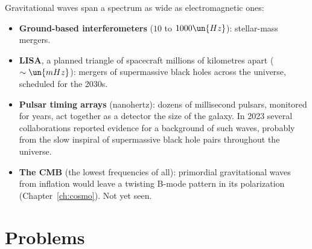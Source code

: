 Gravitational waves span a spectrum as wide as electromagnetic ones:
\begin{itemize}[itemsep=3pt]
  \item \textbf{Ground-based interferometers} ($10$ to $1000\un{Hz}$): stellar-mass mergers.
  \item \textbf{LISA}, a planned triangle of spacecraft millions of kilometres apart ($\sim\un{mHz}$): mergers of supermassive black holes across the universe, scheduled for the 2030s.
  \item \textbf{Pulsar timing arrays} (nanohertz): dozens of millisecond pulsars, monitored for years, act together as a detector the size of the galaxy. In 2023 several collaborations reported evidence for a background of such waves, probably from the slow inspiral of supermassive black hole pairs throughout the universe.
  \item \textbf{The CMB} (the lowest frequencies of all): primordial gravitational waves from inflation would leave a twisting B-mode pattern in its polarization (Chapter~\ref{ch:cosmo}). Not yet seen.
\end{itemize}

\section{Problems}

